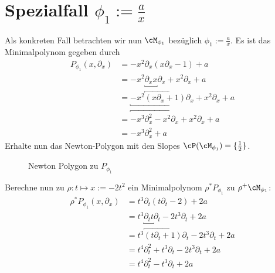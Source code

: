 \section{Spezialfall $\phi_1:=\frac{a}{x}$}
Als konkreten Fall betrachten wir nun $\cM_{\phi_1}$ bezüglich
$\phi_1:=\frac{a}{x}$. Es ist das Minimalpolynom gegeben durch
\begin{align*}
P_{\phi_1}(x,\partial_x) &=-x^2\partial_x (x\partial_x-1)+a
\\&=-x^2\underbracket{\partial_xx}\partial_x+x^2\partial_x+a
\\&=\underbracket{-x^2\overbracket{(x\partial_x+1)}\partial_x} + x^2\partial_x
  + a
\\&=\overbracket{-x^3\partial_x^2 - x^2\partial_x}+x^2\partial_x+a
\\&=-x^3\partial_x^2+a
\end{align*}
Erhalte nun das Newton-Polygon mit den Slopes
$\cP(\cM_{\phi_1})=\{\frac{1}{2}\}$.
\begin{figure}[H]
\caption{Newton Polygon zu $P_{\phi_1}$}
\begin{center}
\end{center}
\end{figure}
Berechne nun zu $\rho:t\mapsto x:=-2t^2$ ein Minimalpolynom $\rho^*P_{\phi_1}$
zu $\rho^+\cM_{\phi_1}$:
\begin{align*}
\rho^*P_{\phi_1}(x,\partial_x)
  &=t^{3}\partial_t(t\partial_t-2)+2a\\
  &=t^{3}\underbracket{\partial_tt}\partial_t-2t^{3}\partial_t+2a\\
  &=t^{3}\overbracket{(t\partial_t+1)}\partial_t-2t^{3}\partial_t+2a\\
  &=t^{4}\partial_t^2+t^{3}\partial_t-2t^{3}\partial_t+2a\\
  &=t^{4}\partial_t^2-t^{3}\partial_t+2a
\end{align*}
\iffalse
  \begin{comment}
  \begin{align*}
  \rho^*P_{\phi_1}(x,\partial_x)
    &=-\frac{1}{2}t^{3}\partial_t
      (\frac{1}{2}t\partial_t-1)+a\\
    &=-\frac{1}{4}t^{3}\underbracket{\partial_tt}\partial_t
      +\frac{1}{2}t^{3}\partial_t+a\\
    &=-\frac{1}{4}t^{3}\overbracket{(t\partial_t+1)}\partial_t
      +\frac{1}{2}t^{3}\partial_t+a\\
    &=-\frac{1}{4}t^{4}\partial_t^2
      \underbracket{-\frac{1}{4}t^{3}\partial_t+\frac{1}{2}t^{3}\partial_t}+a\\
    &=-\frac{1}{4}t^{4}\partial_t^2
      \overbracket{+\frac{1}{4}t^{3}\partial_t}+a
  \end{align*}
  \end{comment}

